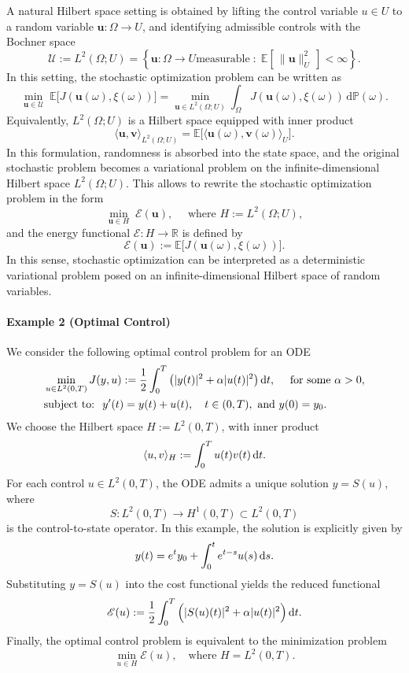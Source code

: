 \documentclass[12pt]{amsart}
\newcommand{\D}[1]{\mbox{\rm #1}}
\newcommand{\dd}{\D{d}}
\numberwithin{equation}{section}
\begin{document}
A natural Hilbert space setting is obtained by lifting the control variable $u \in U$ to a random variable $\mathbf{u} : \Omega \longrightarrow U$, and identifying admissible controls with the Bochner space
\[
    \mathscr{U} := L^2(\Omega; U) = \left\{ \mathbf{u} : \Omega \longrightarrow U  \text{measurable} \;:\; \mathbb{E}[\,\|\mathbf{u}\|_U^2\,] < \infty \right\}.
\]
In this setting, the stochastic optimization problem can be written as
\[
    \min_{\mathbf{u} \in \mathscr{U}} \; \mathbb{E}\big[ J(\mathbf{u}(\omega), \xi(\omega)) \big] = \min_{\mathbf{u} \in L^2(\Omega;U)} \int_{\Omega} J(\mathbf{u}(\omega), \xi(\omega)) \, \mathrm{d}\mathbb{P}(\omega).
\]
Equivalently, $L^2(\Omega;U)$ is a Hilbert space equipped with inner product
\[
    \langle \mathbf{u}, \mathbf{v} \rangle_{L^2(\Omega;U)} = \mathbb{E}\big[\langle \mathbf{u}(\omega), \mathbf{v}(\omega)\rangle_U\big].
\]
In this formulation, randomness is absorbed into the state space, and the original stochastic problem becomes a variational problem on the infinite-dimensional Hilbert space $L^2(\Omega;U)$.
This allows to rewrite the stochastic optimization problem in the form
\[
    \min_{\mathbf{u} \in H} \; \mathscr{E}(\mathbf{u}), \quad \text{ where } H := L^2(\Omega; U), 
\]
and the energy functional $\mathscr{E}: H \to \mathbb{R}$ is defined by
\[
    \mathscr{E}(\mathbf{u}) := \mathbb{E}\big[ J(\mathbf{u}(\omega), \xi(\omega)) \big].
\]
In this sense, stochastic optimization can be interpreted as a deterministic variational problem posed on an infinite-dimensional Hilbert space of random variables.



\paragraph{\textbf{Example 2} (Optimal Control)}


We consider the following optimal control problem for an ODE
\begin{equation*}
\begin{aligned}
    & \min\limits_{u \in L^2(0,T)} J(y,u) := \frac{1}{2} \int_0^T \big(|y(t)|^2 + \alpha |u(t)|^2 \big)\,\dd t, \quad  \text{ for some } \alpha > 0,\\
    & \text{subject to: }\; y'(t) = y(t) + u(t), \quad t \in (0,T), \text{ and } y(0) = y_0.
\end{aligned}
\end{equation*}
We choose the Hilbert space $H := L^2(0,T)$, with inner product
\[
    \langle u,v \rangle_H := \int_0^T u(t)v(t)\,\dd t.
\]
For each control $u \in L^2(0,T)$, the ODE admits a unique solution $y = S(u)$, where
\[
    S: L^2(0,T) \longrightarrow H^1(0,T) \subset L^2(0,T)
\]
is the control-to-state operator. 
In this example, the solution is explicitly given by
\[
    y(t) = e^t y_0 + \int_0^t e^{t-s} u(s)\,\dd s.
\]
Substituting $y = S(u)$ into the cost functional yields the reduced functional
\[
    \mathscr{E}(u) := \frac{1}{2} \int_0^T \Big(|S(u)(t)|^2 + \alpha |u(t)|^2 \Big)\,\dd t.
\]
Finally, the optimal control problem is equivalent to the minimization problem
\[
    \min_{u \in H} \mathscr{E}(u), \quad \text{where } H = L^2(0,T).
\]
\end{document}
